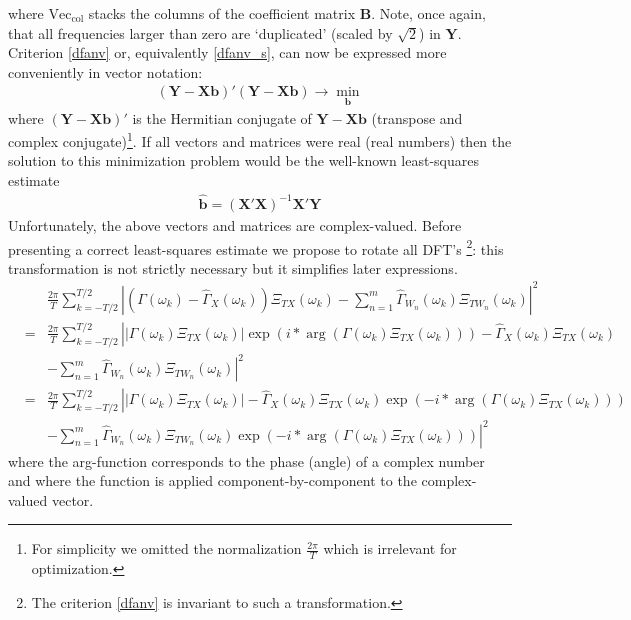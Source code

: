 \documentclass[a4paper]{book}
\begin{document}
where $\textrm{Vec}_\textrm{col}$ stacks the columns of the coefficient matrix $\mathbf{B}$. Note, once again, that all frequencies larger than zero are `duplicated' (scaled by $\sqrt{2}$) in $\mathbf{Y}$. Criterion \ref{dfanv} or, equivalently \ref{dfanv_s}, can now be expressed more conveniently in vector notation:
\begin{eqnarray}\label{irk}
(\mathbf{Y-Xb})'(\mathbf{Y-Xb})\to\min_{\mathbf{b}}
\end{eqnarray}
where $(\mathbf{Y-Xb})'$ is the Hermitian conjugate of $\mathbf{Y-Xb}$ (transpose and complex conjugate)\footnote{For simplicity we omitted the normalization $\frac{2\pi}{T}$ which is irrelevant for optimization.}. If all vectors and matrices were real (real numbers) then the solution to this minimization problem would be the well-known least-squares estimate
\begin{eqnarray*}
\mathbf{\hat{b}}=\left(\mathbf{X'X}\right)^{-1}\mathbf{X'}\mathbf{Y}
\end{eqnarray*}
Unfortunately, the above vectors and matrices are complex-valued. Before presenting a correct least-squares estimate we propose to rotate all DFT's \footnote{The criterion \ref{dfanv} is invariant to such a transformation.}: this transformation is not strictly necessary but it simplifies later expressions.
\begin{eqnarray}\label{dfanver}
&&\frac{2\pi}{T} \sum_{k=-T/2}^{T/2}
\left|\left(\Gamma(\omega_k)-\hat{\Gamma}_X(\omega_k)\right)\Xi_{T
X}(\omega_k)-\sum_{n=1}^m
\hat{\Gamma}_{W_n}(\omega_k)\Xi_{TW_n}(\omega_k)\right|^2\nonumber \\
&=&\frac{2\pi}{T} \sum_{k=-T/2}^{T/2}
\left|\left|\Gamma(\omega_k)\Xi_{TX}(\omega_k)\right| \exp\left(i*\arg\left(\Gamma(\omega_k)\Xi_{TX}(\omega_k)\right)\right)-\hat{\Gamma}_X(\omega_k)\Xi_{TX}(\omega_k)\right.\nonumber\\
&&\left.-\sum_{n=1}^m
\hat{\Gamma}_{W_n}(\omega_k)\Xi_{TW_n}(\omega_k)\right|^2 \nonumber\\
&=&\frac{2\pi}{T} \sum_{k=-T/2}^{T/2}
\left|\left|\Gamma(\omega_k)\Xi_{TX}(\omega_k)\right| -\hat{\Gamma}_X(\omega_k)\Xi_{TX}(\omega_k)\exp\left(-i*\arg\left(\Gamma(\omega_k)\Xi_{T
X}(\omega_k)\right)\right)\right.\nonumber\\
&&\left.-\sum_{n=1}^m
\hat{\Gamma}_{W_n}(\omega_k)\Xi_{TW_n}(\omega_k)\exp\left(-i*\arg\left(\Gamma(\omega_k)\Xi_{T
X}(\omega_k)\right)\right)\right|^2 \label{i-mdfa}
\end{eqnarray}
where the arg-function corresponds to the phase (angle) of a complex number and where the function is applied component-by-component to the complex-valued vector.  
\end{document}

